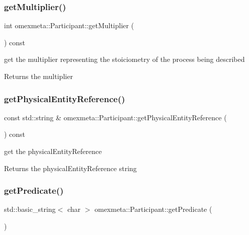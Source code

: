\subsubsection{\texorpdfstring{get\+Multiplier()}{getMultiplier()}}
{\footnotesize\ttfamily int omexmeta\+::\+Participant\+::get\+Multiplier (\begin{DoxyParamCaption}{ }\end{DoxyParamCaption}) const}



get the multiplier representing the stoiciometry of the process being described 

\begin{DoxyReturn}{Returns}
the multiplier 
\end{DoxyReturn}
\mbox{\label{classomexmeta_1_1Participant_a40a5858db6aaae7ec7095b320de838d1}} 
\subsubsection{\texorpdfstring{get\+Physical\+Entity\+Reference()}{getPhysicalEntityReference()}}
{\footnotesize\ttfamily const std\+::string \& omexmeta\+::\+Participant\+::get\+Physical\+Entity\+Reference (\begin{DoxyParamCaption}{ }\end{DoxyParamCaption}) const}



get the physical\+Entity\+Reference 

\begin{DoxyReturn}{Returns}
the physical\+Entity\+Reference string 
\end{DoxyReturn}
\mbox{\label{classomexmeta_1_1Participant_aa09f8c5736dd172b03d7898519d9478d}} 
\subsubsection{\texorpdfstring{get\+Predicate()}{getPredicate()}}
{\footnotesize\ttfamily std\+::basic\+\_\+string$<$ char $>$ omexmeta\+::\+Participant\+::get\+Predicate (\begin{DoxyParamCaption}{ }\end{DoxyParamCaption})}



